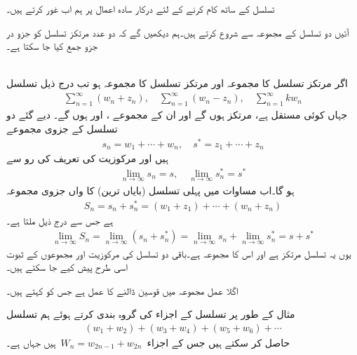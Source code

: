 تسلسل کے ساتھ کام کرنے کے لئے درکار سادہ اعمال پر ہم اب غور کرتے ہیں۔

آئیں دو تسلسل کے مجموعہ سے شروع کرتے ہیں۔ہم دیکھیں گے کہ دو عدد مرتکز تسلسل کو جزو در جزو جمع کیا جا سکتا ہے۔

\quad{}\quad {}\\
اگر مرتکز تسلسل  کا مجموعہ  اور مرتکز تسلسل  کا مجموعہ  ہو تب درج ذیل تسلسل
\begin{align}\label{مساوات_ترتیب_اعمال_الف}
\sum\limits_{n=1}^{\infty} (w_n+z_n), \quad \sum\limits_{n=1}^{\infty} (w_n-z_n), \quad \sum\limits_{n=1}^{\infty} kw_n
\end{align}
جہاں  کوئی مستقل ہے، مرتکز ہوں گے اور ان کے مجموعے ،  اور  ہوں گے۔ 
\quad
دیے گئے دو تسلسل کے جزوی مجموعے
\begin{align*}
s_n=w_1+\cdots+w_n,\quad s^*=z_1+\cdots+z_n
\end{align*}
ہیں اور مرکوزیت کی تعریف کی رو سے
\begin{align*}
\lim_{n\to \infty} s_n=s,\quad \lim_{n\to \infty} s^*_n=s^*
\end{align*}
ہو گا۔اب مساوات  میں   پہلی تسلسل (بایاں ترین) کا  واں جزوی مجموعہ 
\begin{align*}
S_n=s_n+s^*_n=(w_1+z_1)+\cdots+(w_n+z_n)
\end{align*}
ہے جس سے درج ذیل ملتا ہے۔
\begin{align*}
\lim_{n\to\infty}S_n=\lim_{n\to \infty} (s_n+s^*_n)=\lim_{n\to\infty} s_n+\lim_{n\to\infty} s^*_n=s+s^*
\end{align*}
یوں یہ تسلسل مرتکز ہے اور اس کا مجموعہ  ہے۔باقی دو تسلسل کی مرکوزیت اور مجموعوں کے ثبوت اسی طرح پیش کیے جا سکتے ہیں۔

اگلا عمل مجموعہ میں قوسین ڈالنے کا عمل ہے جس کو  کہتے ہیں۔ 

مثال کے طور پر تسلسل  کے اجزاء کی گروہ بندی کرتے ہوئے ہم تسلسل
\begin{align*}
(w_1+w_2)+(w_3+w_4)+(w_5+w_6)+\cdots
\end{align*}
حاصل کر سکتے ہیں جس کے اجزاء 
$\,W_n=w_{2n-1}+w_{2n}\,$
ہیں جہاں  ہے۔

